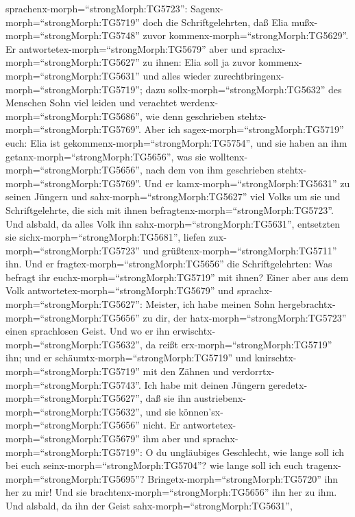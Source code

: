 sprachenx-morph=``strongMorph:TG5723'':
Sagenx-morph=``strongMorph:TG5719'' doch die Schriftgelehrten, daß Elia
mußx-morph=``strongMorph:TG5748'' zuvor
kommenx-morph=``strongMorph:TG5629''.  Er
antwortetex-morph=``strongMorph:TG5679'' aber und
sprachx-morph=``strongMorph:TG5627'' zu ihnen: Elia soll ja zuvor
kommenx-morph=``strongMorph:TG5631'' und alles wieder
zurechtbringenx-morph=``strongMorph:TG5719''; dazu
sollx-morph=``strongMorph:TG5632'' des Menschen Sohn viel leiden und
verachtet werdenx-morph=``strongMorph:TG5686'', wie denn geschrieben
stehtx-morph=``strongMorph:TG5769''.  Aber ich
sagex-morph=``strongMorph:TG5719'' euch: Elia ist
gekommenx-morph=``strongMorph:TG5754'', und sie haben an ihm
getanx-morph=``strongMorph:TG5656'', was sie
wolltenx-morph=``strongMorph:TG5656'', nach dem von ihm geschrieben
stehtx-morph=``strongMorph:TG5769''.  Und er
kamx-morph=``strongMorph:TG5631'' zu seinen Jüngern und
sahx-morph=``strongMorph:TG5627'' viel Volks um sie und Schriftgelehrte,
die sich mit ihnen befragtenx-morph=``strongMorph:TG5723''.
 Und alsbald, da alles Volk ihn
sahx-morph=``strongMorph:TG5631'', entsetzten sie
sichx-morph=``strongMorph:TG5681'', liefen
zux-morph=``strongMorph:TG5723'' und
grüßtenx-morph=``strongMorph:TG5711'' ihn.  Und er
fragtex-morph=``strongMorph:TG5656'' die Schriftgelehrten: Was befragt
ihr euchx-morph=``strongMorph:TG5719'' mit ihnen?  Einer
aber aus dem Volk antwortetex-morph=``strongMorph:TG5679'' und
sprachx-morph=``strongMorph:TG5627'': Meister, ich habe meinen Sohn
hergebrachtx-morph=``strongMorph:TG5656'' zu dir, der
hatx-morph=``strongMorph:TG5723'' einen sprachlosen Geist. 
Und wo er ihn erwischtx-morph=``strongMorph:TG5632'', da reißt
erx-morph=``strongMorph:TG5719'' ihn; und er
schäumtx-morph=``strongMorph:TG5719'' und
knirschtx-morph=``strongMorph:TG5719'' mit den Zähnen und
verdorrtx-morph=``strongMorph:TG5743''. Ich habe mit deinen Jüngern
geredetx-morph=``strongMorph:TG5627'', daß sie ihn
austriebenx-morph=``strongMorph:TG5632'', und sie
können'sx-morph=``strongMorph:TG5656'' nicht.  Er
antwortetex-morph=``strongMorph:TG5679'' ihm aber und
sprachx-morph=``strongMorph:TG5719'': O du ungläubiges Geschlecht, wie
lange soll ich bei euch seinx-morph=``strongMorph:TG5704''? wie lange
soll ich euch tragenx-morph=``strongMorph:TG5695''?
Bringetx-morph=``strongMorph:TG5720'' ihn her zu mir!  Und
sie brachtenx-morph=``strongMorph:TG5656'' ihn her zu ihm. Und alsbald,
da ihn der Geist sahx-morph=``strongMorph:TG5631'',
